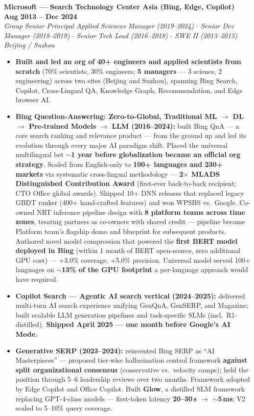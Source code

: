 \documentclass[10.5pt,letterpaper]{article}
\newcommand{\role}[4]{%
  \noindent\textbf{#1} \hfill \textbf{#3}\\
  \textit{#2} \hfill \textit{#4}\par\vspace{2pt}}
\begin{document}
\vspace{4pt}
\role{Microsoft --- Search Technology Center Asia (Bing, Edge, Copilot)}{Group Senior Principal Applied Sciences Manager (2019--2024) $\cdot$ Senior Dev Manager (2018--2019) $\cdot$ Senior Tech Lead (2016--2018) $\cdot$ SWE II (2013--2015)}{Aug 2013 -- Dec 2024}{Beijing / Suzhou}
\begin{itemize}
  \item \textbf{Built and led an org of 40+ engineers and applied scientists from scratch} (70\% scientists, 30\% engineers; \textbf{5 managers} — 3 science, 2 engineering) across two sites (Beijing and Suzhou), spanning Bing Search, Copilot, Cross-Lingual QA, Knowledge Graph, Recommendation, and Edge browser AI.

  \item \textbf{Bing Question-Answering: Zero-to-Global, Traditional ML $\to$ DL $\to$ Pre-trained Models $\to$ LLM (2016--2024):} built Bing QnA — a core search ranking and relevance product — from the ground up and led its evolution through every major AI paradigm shift. Placed the universal multilingual bet \textbf{$\sim$1 year before globalization became an official org strategy}. Scaled from English-only to \textbf{100+ languages and 230+ markets} via systematic cross-lingual methodology — \textbf{2$\times$ MLADS Distinguished Contribution Award} (first-ever back-to-back recipient; CTO Office global awards). Shipped 10+ DNN releases that replaced legacy GBDT ranker (400+ hand-crafted features) and won WPSBS vs.\ Google. Co-owned NRT inference pipeline design with \textbf{8 platform teams across time zones}, treating partners as co-owners with shared credit — pipeline became Platform team's flagship demo and blueprint for subsequent products. Authored novel model compression that powered the \textbf{first BERT model deployed in Bing} (within 1 month of BERT open-source, zero additional GPU cost) — +3.0\% coverage, +5.0\% precision. Universal model served 100+ languages on \textbf{$\sim$13\% of the GPU footprint} a per-language approach would have required.

  \item \textbf{Copilot Search --- Agentic AI search vertical (2024--2025):} delivered multi-turn AI search experience unifying GenQnA, GenSERP, and Magazine; built scalable LLM generation pipelines and task-specific SLMs (incl.\ R1-distilled). \textbf{Shipped April 2025 — one month before Google's AI Mode.}

  \item \textbf{Generative SERP (2023--2024):} reinvented Bing SERP as ``AI Masterpieces'' — proposed tier-wise hallucination control framework \textbf{against split organizational consensus} (conservative vs.\ velocity camps); held the position through 5--6 leadership reviews over two months. Framework adopted by Edge Copilot and Office Copilot. Built \textbf{Glow}, a distilled SLM framework replacing GPT-4-class models — first-token latency \textbf{20--30\,s $\to$ $\sim$5\,ms}; V2 scaled to 5--10\% query coverage.


\end{itemize}
\end{document}
